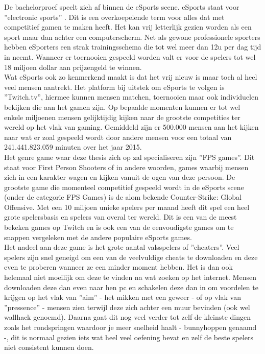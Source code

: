 \documentclass[pdftex,a4paper,12pt,twoside]{report}
\begin{document}
De bachelorproef speelt zich af binnen de eSports scene. eSports staat voor ''electronic sports'' \citep{BenDirs2015}. Dit is een overkoepelende term voor alles dat met competitief gamen te maken heeft. Het kan vrij letterlijk gezien worden als een sport maar dan achter een computerscherm. Net als gewone professionele sporters hebben eSporters een strak trainingsschema die tot wel meer dan 12u per dag tijd in neemt. Wanneer er toernooien gespeeld worden valt er voor de spelers tot wel 18 miljoen dollar aan prijzengeld te winnen. \citep{dota2theinternational} 
\\

Wat eSports ook zo kenmerkend maakt is dat het vrij nieuw is maar toch al heel veel mensen aantrekt. Het platform bij uitstek om eSports te volgen is ''Twitch.tv'', hiermee kunnen mensen matchen, toernooien maar ook individuelen bekijken die aan het gamen zijn. Op bepaalde momenten kunnen er tot wel enkele miljoenen mensen gelijktijdig kijken naar de grootste competities ter wereld op het vlak van gaming. Gemiddeld zijn er 500.000 mensen aan het kijken naar wat er zoal gespeeld wordt door andere mensen voor een totaal van 241.441.823.059 minuten over het jaar 2015. \citep{twitchinfographic}
\\

Het genre game waar deze thesis zich op zal specialiseren zijn ''FPS games''. Dit staat voor First Person Shooters of in andere woorden, games waarbij mensen zich in een karakter wagen en kijken vanuit de ogen van deze persoon. De grootste game die momenteel competitief gespeeld wordt in de eSports scene (onder de categorie FPS Games) is de alom bekende Counter-Strike: Global Offensive. 
 Met een 10 miljoen unieke spelers per maand heeft dit spel een heel grote spelersbasis en spelers van overal ter wereld. Dit is een van de meest bekeken games op Twitch en is ook een van de eenvoudigste games om te snappen vergeleken met de andere populaire eSports games. \citep{csgoblog}
\\

Het nadeel aan deze game is het grote aantal valsspelers of ''cheaters''. Veel spelers zijn snel geneigd om een van de veelvuldige cheats te downloaden en deze even te proberen wanneer ze een minder moment hebben. Het is dan ook helemaal niet moeilijk om deze te vinden na wat zoeken op het internet. Mensen downloaden deze dan even naar hen pc en schakelen deze dan in om voordelen te krijgen op het vlak van ''aim'' - het mikken met een geweer - of op vlak van ''pressence'' - mensen zien terwijl deze zich achter een muur bevinden (ook wel wallhack genoemd). Daarna gaat dit nog veel verder tot zelf de kleinste dingen zoals het rondspringen waardoor je meer snelheid haalt - bunnyhoppen genaamd -, dit is normaal gezien iets wat heel veel oefening bevat en zelf de beste spelers niet consistent kunnen doen. 
\\
\end{document}

